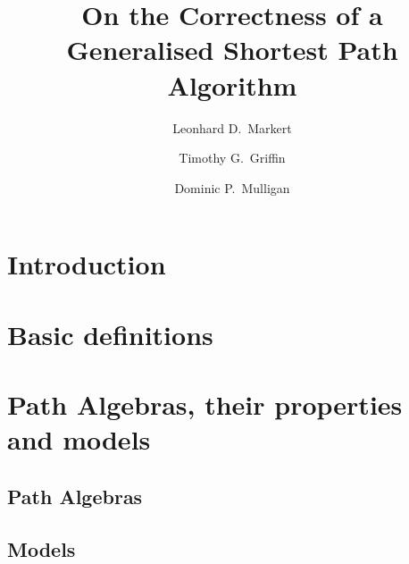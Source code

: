 \documentclass{llncs}
\begin{document}

\title{On the Correctness of a Generalised Shortest Path Algorithm}
\author{Leonhard D.~Markert \and Timothy G.~Griffin \and Dominic P.~Mulligan}

\maketitle

\begin{abstract}

\end{abstract}

\section{Introduction}
\label{sect.introduction}



\section{Basic definitions}
\label{sect.basic.definitions}



\section{Path Algebras, their properties and models}
\label{sect.path.algebras.their.properties.and.models}

\subsection{Path Algebras}
\label{subsect.path.algebras}



\subsection{Models}
\label{subsect.models}
\end{document}

